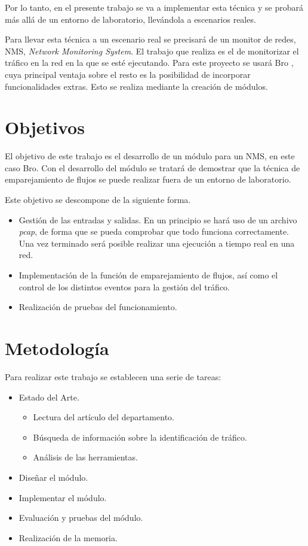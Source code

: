 \intro Por lo tanto, en el presente trabajo se va a implementar esta técnica y se probará más allá de un entorno de laboratorio, 
llevándola a escenarios reales.

\intro Para llevar esta técnica a un escenario real se precisará de un monitor de redes, NMS, \textit{Network Monitoring System}. 
El trabajo que realiza es el de monitorizar el tráfico en la red en la que se esté ejecutando.
Para este proyecto se usará Bro \cite{broindex}, cuya principal ventaja sobre el resto es la posibilidad de incorporar funcionalidades 
extras. Esto se realiza mediante la creación de módulos.

\section{Objetivos}

El objetivo de este trabajo es el desarrollo de un módulo para un NMS, en este caso Bro. Con el desarrollo del módulo se tratará 
de demostrar que la técnica de emparejamiento de flujos se puede realizar fuera de un entorno de laboratorio.

\intro Este objetivo se descompone de la siguiente forma.

\begin{itemize}
\item Gestión de las entradas y salidas. En un principio se hará uso de un archivo \textit{pcap}, de forma 
que se pueda comprobar que todo funciona correctamente. Una vez terminado será posible realizar una ejecución a tiempo real en una 
red.
\item Implementación de la función de emparejamiento de flujos, así como el control de los distintos eventos para la gestión del 
tráfico.
\item Realización de pruebas del funcionamiento.
\end{itemize}

\section{Metodología}

Para realizar este trabajo se establecen una serie de tareas:

\begin{itemize}
\item Estado del Arte.
	\begin{itemize}
	\item Lectura del artículo del departamento. \cite{comparacion}
	\item Búsqueda de información sobre la identificación de tráfico.
	\item Análisis de las herramientas.
	\end{itemize}
\item Diseñar el módulo.
\item Implementar el módulo.
\item Evaluación y pruebas del módulo.
\item Realización de la memoria.
\end{itemize}

